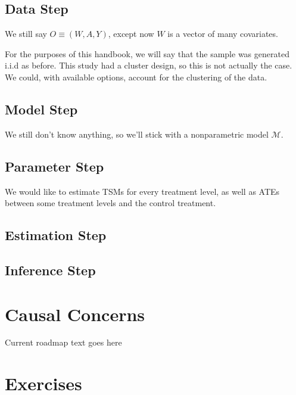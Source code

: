 \documentclass[
  12pt, krantz2,
]{krantz}
\theoremstyle{definition}
\theoremstyle{definition}
\theoremstyle{definition}
\newcommand{\1}{\mathbbm{1}}
\begin{document}
\hypertarget{data-step-1}{%
\subsection{Data Step}\label{data-step-1}}

We still say \(O \equiv (W,A,Y)\), except now \(W\) is a vector of many covariates.

For the purposes of this handbook, we will say that the sample was generated i.i.d as before. This study had a cluster design, so this is not actually the case. We could, with available options, account for the clustering of the data.

\hypertarget{model-step-1}{%
\subsection{Model Step}\label{model-step-1}}

We still don't know anything, so we'll stick with a nonparametric model \(\mathcal{M}\).

\hypertarget{parameter-step-1}{%
\subsection{Parameter Step}\label{parameter-step-1}}

We would like to estimate TSMs for every treatment level, as well as ATEs between some treatment levels and the control treatment.

\hypertarget{estimation-step-1}{%
\subsection{Estimation Step}\label{estimation-step-1}}

\hypertarget{inference-step-1}{%
\subsection{Inference Step}\label{inference-step-1}}

\hypertarget{causal-concerns}{%
\section{Causal Concerns}\label{causal-concerns}}

Current roadmap text goes here

\hypertarget{exercises}{%
\section{Exercises}\label{exercises}}
\end{document}
